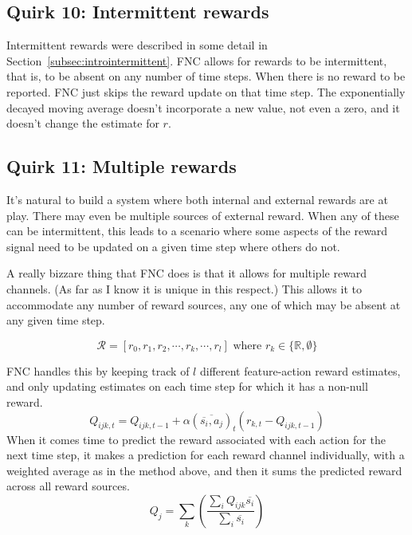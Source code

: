 \subsection*{Quirk 10: Intermittent rewards}
\label{algointermittentrewards}

Intermittent rewards were described in some detail in
Section~\ref{subsec:introintermittent}. FNC allows for rewards to be intermittent,
that is, to be absent on any number of time steps. When there is no reward
to be reported. FNC just skips the reward update on that time step. 
The exponentially decayed moving average doesn't incorporate a new value,
not even a zero, and it doesn't change the estimate for $r$.

\subsection*{Quirk 11: Multiple rewards}
\label{algomultiplerewards}

It’s natural to build a system where both internal and external rewards are at play.
There may even be multiple sources of external reward. When any of these
can be intermittent, this leads to a scenario
where some aspects of the reward signal need to be updated on a given time step
where others do not.

A really bizzare thing that FNC does is that it allows for multiple reward channels. 
(As far as I know it is unique in this respect.)
This allows it to accommodate any number of reward sources, any one of which
may be absent at any given time step.

\begin{equation}
\mathcal{R} = [r_0, r_1, r_2, \cdots, r_k, \cdots, r_l]
\mbox{ where } r_k \in \{\mathbb{R}, \emptyset\}
\end{equation}

FNC handles this by keeping track of $l$ different feature-action reward 
estimates, and only updating estimates on each time step for which it
has a non-null reward.
\begin{equation}
Q_{ijk, t} = Q_{ijk, t-1} + \alpha
(\overline{\overline{s_i}, a_j})_t
(r_{k,t} - Q_{ijk, t-1})
\end{equation}
When it comes time to predict the reward associated
with each action for the next time step, it makes a prediction for each
reward channel individually, with a weighted average as in the method above,
and then it sums the predicted reward across all reward sources.
\begin{equation}
Q_{j} = \sum_k \left ( \frac{\sum_i Q_{ijk} \overline{s_i}}
{\sum_i \overline{s_i}} \right )
\end{equation}


